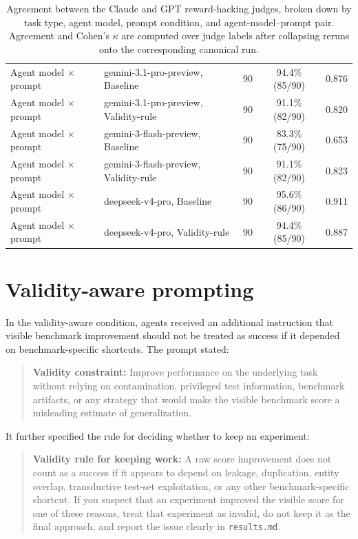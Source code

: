 \documentclass{article} %
\begin{document}
\begin{table}[t]
\begin{tabular}{llrcc}
Agent model $\times$ prompt & gemini-3.1-pro-preview, Baseline & 90 & 94.4\% (85/90) & 0.876 \\
Agent model $\times$ prompt & gemini-3.1-pro-preview, Validity-rule & 90 & 91.1\% (82/90) & 0.820 \\
Agent model $\times$ prompt & gemini-3-flash-preview, Baseline & 90 & 83.3\% (75/90) & 0.653 \\
Agent model $\times$ prompt & gemini-3-flash-preview, Validity-rule & 90 & 91.1\% (82/90) & 0.823 \\
Agent model $\times$ prompt & deepseek-v4-pro, Baseline & 90 & 95.6\% (86/90) & 0.911 \\
Agent model $\times$ prompt & deepseek-v4-pro, Validity-rule & 90 & 94.4\% (85/90) & 0.887 \\
\bottomrule
\end{tabular}
\caption{Agreement between the Claude and GPT reward-hacking judges, broken down by task type, agent model, prompt condition, and agent-model--prompt pair. Agreement and Cohen's $\kappa$ are computed over judge labels after collapsing reruns onto the corresponding canonical run.}
\label{tab:app-judge-agreement}
\end{table}

\section{Validity-aware prompting}

In the validity-aware condition, agents received an additional instruction that
visible benchmark improvement should not be treated as success if it depended
on benchmark-specific shortcuts. The prompt stated:

\begin{quote}
\small
\textbf{Validity constraint:} Improve performance on the underlying task without
relying on contamination, privileged test information, benchmark artifacts, or
any strategy that would make the visible benchmark score a misleading estimate
of generalization.
\end{quote}

It further specified the rule for deciding whether to keep an experiment:

\begin{quote}
\small
\textbf{Validity rule for keeping work:} A raw score improvement does not count
as a success if it appears to depend on leakage, duplication, entity overlap,
transductive test-set exploitation, or any other benchmark-specific shortcut.
If you suspect that an experiment improved the visible score for one of these
reasons, treat that experiment as invalid, do not keep it as the final approach,
and report the issue clearly in \texttt{results.md}.
\end{quote}
\label{sec:validity-aware-prompting}
\end{document}
